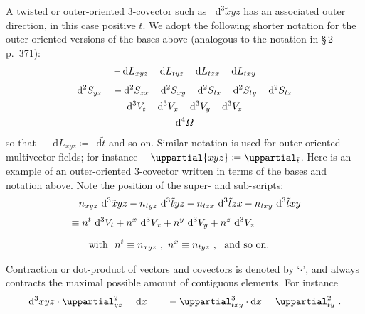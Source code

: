 \documentclass[\ifafour a4paper,12pt,\else a5paper,10pt,\fi%
onecolumn,oneside,article,%
british%
]{memoir}
\theoremstyle{remark}
\theoremstyle{innote}
\newcommand*{\de}{\mathop{}\!\uppartial}%
\newcommand*{\di}{\mathop{}\!\mathrm{d}}%
\newcommand*{\defd}{\coloneqq}
\renewcommand*{\|}[1][]{\nonscript\:#1\vert\nonscript\:\mathopen{}}
\newcommand*{\sect}{\S}%
\newcommand*{\se}[1]{\de_{#1}}
\newcommand*{\sse}[1]{\de^{2}_{#1}}
\newcommand*{\ssse}[1]{\de^{3}_{#1}}
\newcommand*{\si}[1]{\di{#1}}
\newcommand*{\sssi}[1]{\di^{3}{#1}}
\newcommand*{\tw}[1]{\tilde{#1}}
\newcommand*{\te}[1]{\de{#1}}
\newcommand*{\ti}[1]{\di L_{#1}}
\newcommand*{\tti}[1]{\di^{2}S_{#1}}
\newcommand*{\ttti}[1]{\di^{3}V_{#1}}
\newcommand*{\tttti}[1]{\di^{4}\varOmega_{#1}}
\begin{document}
A twisted or outer-oriented 3-covector such as $\sssi{\tw{x}yz}$ has an associated outer direction, in this case positive $t$. We adopt the following shorter notation for the outer-oriented versions of the bases above (analogous to the notation in  \cites{gotayetal1992} \sect\,2 p.~371):
\begin{subequations}\label{eq:basis_twshort}
  \begin{gather}
    \label{eq:basis_1vec_twshort}
    -\ti{xyz}\quad
    \ti{tyz}\quad
    \ti{tzx}\quad
    \ti{txy}
    \\[\jot]
    \label{eq:basis_2vec_twshort}
    \tti{yz}\quad
    -\tti{zx}\quad
    \tti{xy}\quad
    \tti{tx}\quad
    \tti{ty}\quad
    \tti{tz}
    \\
    \label{eq:basis_3vec_twshort}
    \ttti{t}\quad
    \ttti{x}\quad
    \ttti{y}\quad
    \ttti{z}
    \\
    \label{eq:basis_4vec_twshort}
    \tttti{}
  \end{gather}
\end{subequations}
so that $-\ti{xyz} \defd \si{\tw{t}}$ and so on. Similar notation is used for outer-oriented multivector fields; for instance $-\te{xyz} \defd \se{\tw{t}}$. Here is an example of an outer-oriented 3-covector written in terms of the bases and notation above. Note the position of the super- and sub-scripts:
\begin{equation}
  \label{eq:examples_expansion}
  \begin{split}
   &\quad n_{xyz}\,\sssi{\tw{x}yz}
    -n_{tyz}\,\sssi{\tw{t}yz}
    -n_{tzx}\,\sssi{\tw{t}zx}
    -n_{txy}\,\sssi{\tw{t}xy}
    \\[\jot]
    &\equiv
    n^{t}\,\ttti{t} +
    n^{x}\,\ttti{x} +
    n^{y}\,\ttti{y} +
    n^{z}\,\ttti{z}
    \\[2\jot]
    &\qquad\text{with }\ 
    n^{t} \equiv n_{xyz}\ ,\
    n^{x} \equiv n_{tyz}\ ,\
    \text{ and so on}.
  \end{split}
\end{equation}

\medskip

Contraction or dot-product of vectors and covectors is denoted by \enquote*{$\cdot$}, and always contracts the maximal possible amount of contiguous elements. For instance
\begin{equation}
  \label{eq:contraction_ex}
  \sssi{xyz} \cdot \sse{yz} = \si{x}
  \qquad
  -\ssse{txy} \cdot \si{x} = \sse{ty} \ .
\end{equation}
\end{document}
